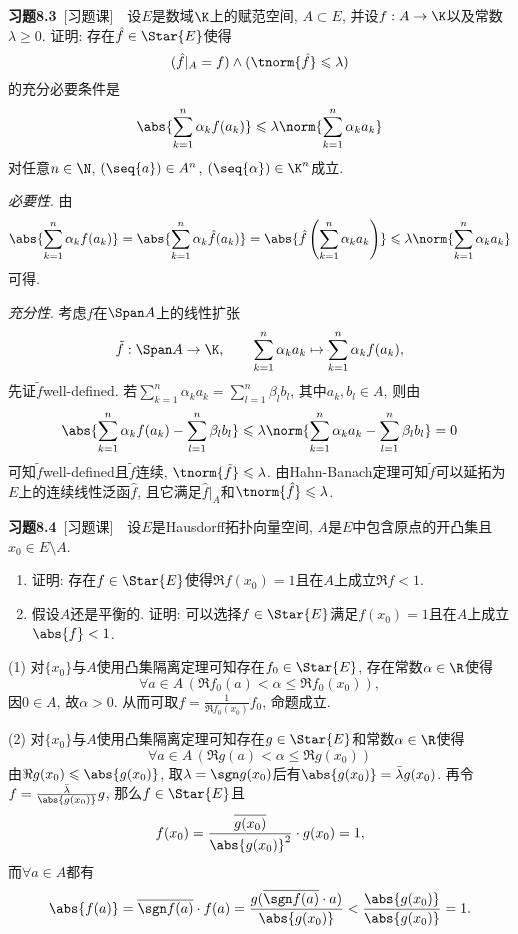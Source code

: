 	\textbf{习题8.3}\ [习题课]\ \ 设$ E $是数域$ \K $上的赋范空间, $ A\subset E $, 并设$ f : A\to\K $以及常数$ \lambda\geqslant 0 $. 证明: 存在$ \hat{f}\in\Star{E} $使得
	\[
	(\hat{f}\rvert_A=f)\land (\tnorm{\hat{f}}\leqslant\lambda)
	\]
	的充分必要条件是
	\[
	\abs{\sum_{k=1}^n\alpha_kf(a_k)}\leqslant\lambda\norm{\sum_{k=1}^n\alpha_ka_k}
	\]
	对任意$ n\in\N $, $ (\seq{a})\in A^n $, $ (\seq{\alpha})\in\K^n $成立.
	\begin{answer}
	\textsl{必要性}. 由
	\[
	\abs{\sum_{k=1}^n\alpha_kf(a_k)}=\abs{\sum_{k=1}^n\alpha_k\hat{f}(a_k)}=\abs{\hat{f}\left( \sum_{k=1}^n\alpha_ka_k \right)}\leqslant\lambda\norm{\sum_{k=1}^n\alpha_ka_k}
	\]
	可得.
	
	\textsl{充分性}. 考虑$ f $在$ \Span A $上的线性扩张
	\[
	\tilde{f} : \Span A\to\K,\qquad \sum_{k=1}^n\alpha_ka_k\mapsto\sum_{k=1}^n\alpha_kf(a_k),
	\]
	先证$ \tilde{f} $well-defined. 若$ \sum\limits_{k=1}^n\alpha_ka_k=\sum\limits_{l=1}^n\beta_lb_l $, 其中$ a_k, b_l\in A $, 则由
	\[
	\abs{\sum_{k=1}^n\alpha_kf(a_k)-\sum_{l=1}^n\beta_lb_l}\leqslant\lambda\norm{\sum_{k=1}^n\alpha_ka_k-\sum_{l=1}^n\beta_lb_l}=0
	\]
	可知$ \tilde{f} $well-defined且$ \tilde{f} $连续, $ \tnorm{\tilde{f}}\leqslant\lambda $. 由Hahn-Banach定理可知$ \tilde{f} $可以延拓为$ E $上的连续线性泛函$ \hat{f} $, 且它满足$ \hat{f}\rvert_A $和$ \tnorm{\hat{f}}\leqslant\lambda $.\qedhere
	\end{answer}
	
	\textbf{习题8.4}\ [习题课]\ \ 设$ E $是Hausdorff拓扑向量空间, $ A $是$ E $中包含原点的开凸集且$ x_0\in E\setminus A $.
	\begin{enumerate}
	\item 证明: 存在$ f\in\Star{E} $使得$ \Re f(x_0)=1 $且在$ A $上成立$ \Re f<1 $.
	\item 假设$ A $还是平衡的. 证明: 可以选择$ f\in\Star{E} $满足$ f(x_0)=1 $且在$ A $上成立$ \abs{f}<1 $.
	\end{enumerate}
	\begin{answer}
	(1) 对$ \{x_0\} $与$ A $使用凸集隔离定理可知存在$ f_0\in\Star{E} $, 存在常数$ \alpha\in\R $使得
	\[
	\forall a\in A\,(\Re f_0(a)<\alpha\leqslant\Re f_0(x_0)),
	\]
	因$ 0\in A $, 故$ \alpha>0 $. 从而可取$ f=\frac{1}{\Re f_0(x_0)}f_0 $, 命题成立.
	
	(2) 对$ \{ x_0 \} $与$ A $使用凸集隔离定理可知存在$ g\in\Star{E} $和常数$ \alpha\in\R $使得
	\[
	\forall a\in A\,(\Re g(a)<\alpha\leqslant\Re g(x_0))
	\]
	由$ \Re g(x_0)\leqslant\abs{g(x_0)} $, 取$ \lambda=\sgn g(x_0) $后有$ \abs{g(x_0)}=\bar{\lambda}g(x_0) $. 再令$ f=\frac{\bar{\lambda}}{\abs{g(x_0)}}g $, 那么$ f\in\Star{E} $且
	\[
	f(x_0)=\frac{\overline{g(x_0)}}{\abs{g(x_0)}^2}\cdot g(x_0)=1,
	\]
	而$ \forall a\in A $都有
	\[
	\abs{f(a)}=\overline{\sgn f(a)}\cdot f(a)=\frac{g(\overline{\sgn f(a)}\cdot a)}{\abs{g(x_0)}}<\frac{\abs{g(x_0)}}{\abs{g(x_0)}}=1.
	\]
	\qedhere
	\end{answer}
	

